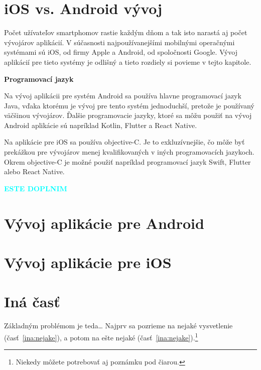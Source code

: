 \documentclass[10pt,twoside,slovak,a4paper]{article}
\begin{document}
\section{iOS vs. Android vývoj}
\quad 	Počet užívateľov smartphomov rastie každým dňom a tak isto narastá aj počet vývojárov aplikácií. V súčasnosti najpoužívanejšími mobilnými operačnými systémami sú iOS, od firmy Apple a Android, od spoločnosti Google. Vývoj aplikácií pre tieto systémy je odlišný a tieto rozdiely si povieme v tejto kapitole.

\textbf{Programovací jazyk}

Na vývoj aplikácii pre systém Android sa používa hlavne programovací jazyk Java, vďaka ktorému je vývoj pre tento systém jednoduchší, pretože je používaný väčšinou vývojárov. Ďalšie programovacie jazyky, ktoré sa môžu použiť na vývoj Android aplikácie sú napríklad Kotlin, Flutter a React Native.

Na aplikácie pre iOS sa používa objective-C. Je to exkluzívnejšie, čo môže byť prekážkou pre vývojárov menej kvalifikovaných v iných programovacích jazykoch. Okrem objective-C je možné použiť napríklad programovací jazyk Swift, Flutter alebo React Native.




\vspace{1.5cm}
\textcolor{cyan}{{\textbf{\huge ESTE DOPLNIM}}}
\vspace{1.5cm}



\section{Vývoj aplikácie pre Android}




\section{Vývoj aplikácie pre iOS}


\vspace{5cm}




\section{Iná časť} \label{ina}

Základným problémom je teda\ldots{} Najprv sa pozrieme na nejaké vysvetlenie (časť~\ref{ina:nejake}), a potom na ešte nejaké (časť~\ref{ina:nejake}).\footnote{Niekedy môžete potrebovať aj poznámku pod čiarou.}
\end{document}
